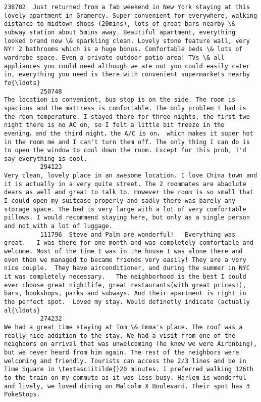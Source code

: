 \documentclass[11pt]{article}
\begin{document}
\begin{Verbatim}[commandchars=\\\{\}]
          238782  Just returned from a fab weekend in New York staying at this lovely apartment in Gramercy. Super convenient for everywhere, walking distance to midtown shops (20mins), lots of great bars nearby \& subway station about 5mins away. Beautiful apartment, everything looked brand new \& sparkling clean. Lovely stone feature wall, very NY! 2 bathrooms which is a huge bonus. Comfortable beds \& lots of wardrobe space. Even a private outdoor patio area! TVs \& all appliances you could need although we ate out you could easily cater in, everything you need is there with convenient supermarkets nearby fo{\ldots}   
          250748                                                                                                             The location is convenient, bus stop is on the side. The room is spacious and the mattress is comfortable. The only problem I had is the room temperature. I stayed there for three nights, the first two night there is no AC on, so I felt a little bit freeze in the evening，and the third night，the A/C is on， which makes it super hot in the room me and I can't turn them off. The only thing I can do is to open the window to cool down the room. Except for this prob, I'd say everything is cool.   
          294123                                                                                                                                                                Very clean, lovely place in an awesome location. I love China town and it is actually in a very quite street. The 2 roommates are abaolute dears as well and great to talk to. However the room is so small that I could open my suitcase properly and sadly there was barely any storage space. The bed is very large with a lot of very comfortable pillows. I would recommend staying here, but only as a single person and not with a lot of luggage.   
          111796  Steve and Palm are wonderful!   Everything was great.   I was there for one month and was completely comfortable and welcome. Most of the time I was in the house I was alone there and even then we managed to became friends very easily! They are a very nice couple.  They have airconditioner, and during the summer in NYC it was completely necessary.   The neighborhood is the best I could ever choose great nightlife, great restaurants(with great prices!), bars, bookshops, parks and subways. And their apartment is right in the perfect spot.  Loved my stay. Would definetly indicate (actually al{\ldots}   
          274232                                                                We had a great time staying at Tom \& Emma's place. The roof was a really nice addition to the stay. We had a visit from one of the neighbors on arrival that was unwelcoming (he knew we were Airbnbing), but we never heard from him again. The rest of the neighbors were welcoming and friendly. Tourists can access the 2/3 lines and be in Time Square in \textasciitilde{}20 minutes. I preferred walking 126th to the train on my commute as it was less busy. Harlem is wonderful and lively, we loved dining on Malcolm X Boulevard. Their spot has 3 PokeStops.   

\end{Verbatim}
\end{document}

